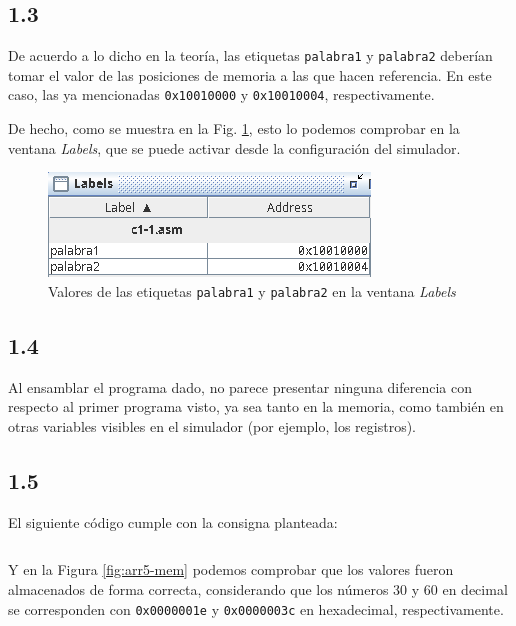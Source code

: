 \documentclass[a4paper]{report}
\begin{document}
\subsection*{1.3}

De acuerdo a lo dicho en la teoría, las etiquetas \texttt{palabra1} y \texttt{palabra2} deberían tomar el valor de las posiciones de memoria a las que hacen referencia. En este caso, las ya mencionadas \texttt{0x10010000} y \texttt{0x10010004}, respectivamente.

De hecho, como se muestra en la Fig. \ref{fig:labels-fst}, esto lo podemos comprobar en la ventana \textit{Labels}, que se puede activar desde la configuración del simulador.

\begin{figure}[h]
    \centering
    \captionsetup{justification = centering}
    \includegraphics[width=.5\linewidth]{img/c1-3}
    \caption{Valores de las etiquetas \texttt{palabra1} y \texttt{palabra2} en la ventana \textit{Labels}}
    \label{fig:labels-fst}
\end{figure}

\subsection*{1.4}

Al ensamblar el programa dado, no parece presentar ninguna diferencia con respecto al primer programa visto, ya sea tanto en la memoria, como también en otras variables visibles en el simulador (por ejemplo, los registros).

\subsection*{1.5}

El siguiente código cumple con la consigna planteada:

\vspace{7pt}
\inputminted[linenos]{gas}{src/cuestiones/c1-5.asm}
\vspace{7pt}

Y en la Figura \ref{fig:arr5-mem} podemos comprobar que los valores fueron almacenados de forma correcta, considerando que los números 30 y 60 en decimal se corresponden con \texttt{0x0000001e} y \texttt{0x0000003c} en hexadecimal, respectivamente.
\end{document}
